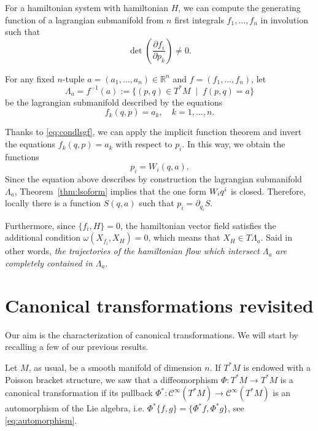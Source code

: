 \documentclass[english,fontsize=11pt,paper=a5,oneside]{scrbook}
\newcommand{\cC}{\mathcal{C}}
\newcommand{\R}{\mathbb{R}}
\let\d\relax
\DeclareMathOperator{\d}{d}
\theoremstyle{definition}
\newenvironment{remark}
  {\pushQED{\qed}\renewcommand{\qedsymbol}{$\lozenge$}\remarkx}
  {\popQED\endremarkx}
\begin{document}
\begin{remark}\label{rmk:nfils}
    For a hamiltonian system with hamiltonian $H$, we can compute the generating function of a lagrangian submanifold from $n$ first integrals $f_1, \ldots, f_n$ in involution such that
    \begin{equation}\label{eq:condlsgf}
        \det\left(\frac{\partial f_i}{\partial p_k}\right) \neq 0.
    \end{equation}

    For any fixed $n$-tuple $a = (a_1, \ldots, a_n) \in \R^n$ and $f=(f_1,\ldots,f_n)$, let
    \begin{equation}
        \Lambda_a = f^{-1}(a) := \{(p,q)\in T^*M \;\mid\; f(p,q) = a\}
    \end{equation}
    be the lagrangian submanifold described by the equations
    \begin{equation}
        f_k(q,p) = a_k, \quad k=1,\ldots,n.
    \end{equation}

    Thanks to \eqref{eq:condlsgf}, we can apply the implicit function theorem and invert the equations $f_k(q,p) = a_k$ with respect to $p_i$. In this way, we obtain the functions
    \begin{equation}
        p_i = W_i(q,a).
    \end{equation}
    Since the equation above describes by construction the lagrangian submanifold $\Lambda_a$, Theorem~\ref{thm:lsoform} implies that the one form $W_i\d q^i$ is closed.
    Therefore, locally there is a function $S(q, a)$ such that $p_i = \partial_{q_i} S$.
    
    Furthermore, since $\big\{f_i, H\big\} = 0$, the hamiltonian vector field satisfies the additional condition $\omega(X_{f_i}, X_H) = 0$, which means that $X_H\in T\Lambda_a$. Said in other words, \emph{the trajectories of the hamiltonian flow which intersect $\Lambda_a$ are completely contained in $\Lambda_a$}.
\end{remark}

\section{Canonical transformations revisited}

Our aim is the characterization of canonical transformations.
We will start by recalling a few of our previous results.

Let $M$, as usual, be a smooth manifold of dimension $n$.
%
If $T^*M$ is endowed with a Poisson bracket structure, we saw that a diffeomorphism $\Phi:T^*M\to T^*M$ is a canonical transformation if its pullback $\Phi^*:\cC^\infty(T^*M)\to\cC^\infty(T^*M)$ is an automorphism of the Lie algebra, i.e. $\Phi^*\big\{f,g\big\} = \big\{\Phi^* f, \Phi^* g\big\}$, see \eqref{eq:automorphism}.
\end{document}
